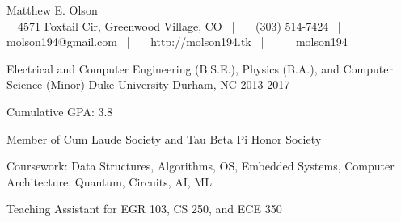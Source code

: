 \documentclass[11pt, letterpaper]{resume}
\begin{document}
	\begin{center}
    	{\fontsize{26pt}{1em}\headerfontlight\color{black} Matthew E. Olson}
        \vspace{3mm}
    	\\
    	{\fontsize{8pt}{1em}\headerfont\color{darkgray}
    		{\fontsize{8pt}{1em}\faHome\ \, 4571 Foxtail Cir, Greenwood Village, CO} \, | \,
    		{\fontsize{8pt}{1em}\faMobile\ \, (303) 514-7424} \, | \,
    		{\fontsize{8pt}{1em}\faEnvelope\ \, molson194@gmail.com} \, | \,
    		{\fontsize{8pt}{1em}\faUser\ \, http://molson194.tk} \, | \,
    		{\fontsize{8pt}{1em}\faGithubSquare\ \, \fontsize{8pt}{1em}\faLinkedinSquare\ \, molson194}
    	}
    \end{center}
    \par\addvspace{2.5ex}
    
    \fancyfoot[L]{\footerstyle{\today}}
  	\fancyfoot[R]{\footerstyle{\thepage}} 

\begin{cventries}
  \cventry
    {Electrical and Computer Engineering (B.S.E.), Physics (B.A.), and Computer Science (Minor)}
    {Duke University}
    {Durham, NC}
    {2013-2017}
    {
      \begin{cvitems}
        \item {Cumulative GPA: 3.8}
        \item{Member of Cum Laude Society and Tau Beta Pi Honor Society}
        \item {Coursework: Data Structures, Algorithms, OS, Embedded Systems, Computer Architecture, Quantum, Circuits, AI, ML}
        \item{Teaching Assistant for EGR 103, CS 250, and ECE 350}
      \end{cvitems}
    }
\end{cventries}
\end{document}
